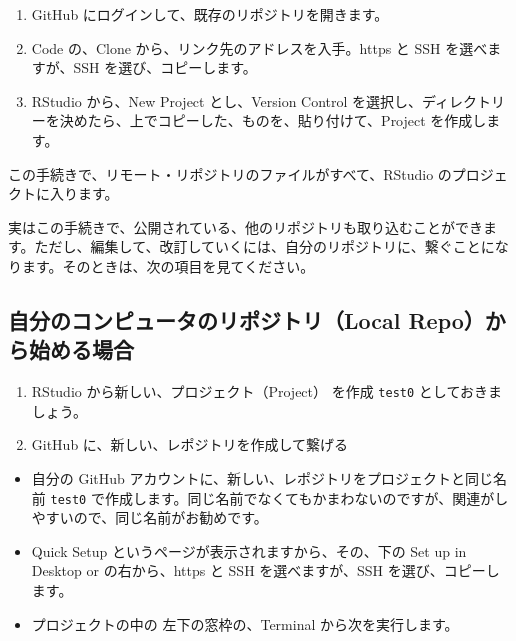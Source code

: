 \documentclass[
  xelatex, ja=standard]{bxjsbook}
\providecommand{\tightlist}{%
  \setlength{\itemsep}{0pt}\setlength{\parskip}{0pt}}
\theoremstyle{definition}
\theoremstyle{definition}
\theoremstyle{definition}
\theoremstyle{definition}
\theoremstyle{remark}
\begin{document}
\begin{enumerate}
\def\labelenumi{\arabic{enumi}.}
\tightlist
\item
  GitHub にログインして、既存のリポジトリを開きます。
\item
  Code の、Clone から、リンク先のアドレスを入手。https と SSH を選べますが、SSH を選び、コピーします。
\item
  RStudio から、New Project とし、Version Control を選択し、ディレクトリーを決めたら、上でコピーした、ものを、貼り付けて、Project を作成します。
\end{enumerate}

この手続きで、リモート・リポジトリのファイルがすべて、RStudio のプロジェクトに入ります。

実はこの手続きで、公開されている、他のリポジトリも取り込むことができます。ただし、編集して、改訂していくには、自分のリポジトリに、繋ぐことになります。そのときは、次の項目を見てください。

\hypertarget{ux81eaux5206ux306eux30b3ux30f3ux30d4ux30e5ux30fcux30bfux306eux30eaux30ddux30b8ux30c8ux30ealocal-repoux304bux3089ux59cbux3081ux308bux5834ux5408}{%
\subsection{自分のコンピュータのリポジトリ（Local Repo）から始める場合}\label{ux81eaux5206ux306eux30b3ux30f3ux30d4ux30e5ux30fcux30bfux306eux30eaux30ddux30b8ux30c8ux30ealocal-repoux304bux3089ux59cbux3081ux308bux5834ux5408}}

\begin{enumerate}
\def\labelenumi{\arabic{enumi}.}
\tightlist
\item
  RStudio から新しい、プロジェクト（Project） を作成 \texttt{test0} としておきましょう。
\item
  GitHub に、新しい、レポジトリを作成して繋げる
\end{enumerate}

\begin{itemize}
\tightlist
\item
  自分の GitHub アカウントに、新しい、レポジトリをプロジェクトと同じ名前 \texttt{test0} で作成します。同じ名前でなくてもかまわないのですが、関連がしやすいので、同じ名前がお勧めです。
\item
  Quick Setup というページが表示されますから、その、下の Set up in Desktop or の右から、https と SSH を選べますが、SSH を選び、コピーします。
\item
  プロジェクトの中の 左下の窓枠の、Terminal から次を実行します。
\end{itemize}
\end{document}
